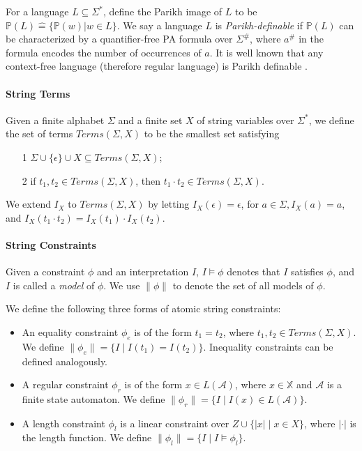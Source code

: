 \documentclass[runningheads]{llncs}
\newcommand{\Def}{\hat{=}}
\begin{document}
For a language $L\subseteq \Sigma^*$, 
define the Parikh image of $L$ to be 
$\mathbb{P}(L)\Def \{\mathbb{P}(w) | w\in L\}$.
We say a language $L$ is \emph{Parikh-definable} 
if $\mathbb{P}(L)$ can be characterized by a quantifier-free PA formula over $\Sigma^\#$, 
where $a^\#$ in the formula encodes the number of occurrences of $a$.
It is well known that
any context-free language (therefore regular language) 
is Parikh definable \cite{Parikh66}.

\paragraph{String Terms}
Given a finite alphabet $\Sigma$ and 
a finite set $X$ of string variables over $\Sigma^*$,
we define the set of terms $\textit{Terms}(\Sigma,X)$ 
to be the smallest set satisfying
\begin{itemize}
    \item[1] $\Sigma\cup \{\epsilon\} \cup X \subseteq \textit{Terms}(\Sigma,X)$;
    \item[2] if $t_1,t_2\in \textit{Terms}(\Sigma,X)$, then $t_1 \cdot t_2 \in \textit{Terms}(\Sigma,X)$.
\end{itemize} 

We extend $I_X$ to $\textit{Terms}(\Sigma,X)$ by letting $I_X(\epsilon)=\epsilon$, 
for $a\in \Sigma, I_X(a)=a$,
and $I_X(t_1\cdot t_2)= I_X(t_1)\cdot I_X(t_2)$.

\paragraph{String Constraints} \label{par: string constraints}
Given a constraint $\phi$ and an interpretation $I$,
$I\models \phi$ denotes that $I$ satisfies $\phi$,
and $I$ is called a \emph{model} of $\phi$.
We use $\lVert \phi\rVert$ to denote the set of all models of $\phi$.

We define the following three forms of atomic string constraints:
\begin{itemize}
\item An equality constraint $\phi_e$ is of the form 
$t_1 = t_2$, where $t_1,t_2\in \textit{Terms}(\Sigma,X)$.
We define $\lVert \phi_e \rVert = \{I\mid I(t_1)=I(t_2)\}$.
Inequality constraints can be defined analogously.

\item A regular constraint $\phi_r$ is of the form 
$x\in L(\mathcal{A})$,
where $x\in \mathbb{X}$ and $\mathcal{A}$ is a finite state automaton.
We define $\lVert \phi_r \rVert = \{I\mid I(x)\in L(\mathcal{A})\}$.

\item A length constraint $\phi_l$ is a linear constraint over 
$Z \cup \{|x| \mid x\in X\}$, %
where $|\cdot |$ is the length function.
We define $\lVert \phi_l \rVert = \{I \mid I\models \phi_l \}$.
\end{itemize}
\end{document}
